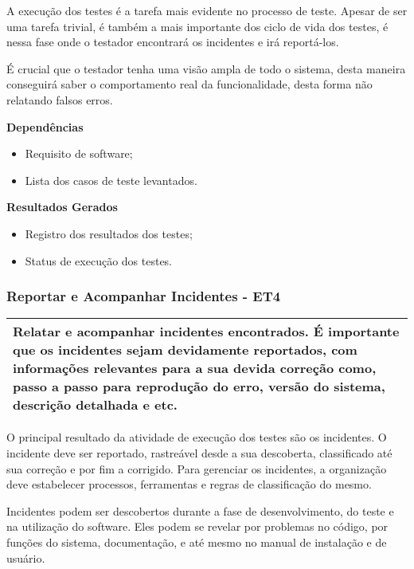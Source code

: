 A execução dos testes é a tarefa mais evidente no processo de teste. Apesar de ser uma tarefa trivial, é também a mais importante dos ciclo de vida dos testes, é nessa fase onde o testador encontrará os incidentes e irá reportá-los.

É crucial que o testador tenha uma visão ampla de todo o sistema, desta maneira conseguirá saber o comportamento real da funcionalidade, desta forma não relatando falsos erros.

\textbf{Dependências}
\begin{itemize}
    \item Requisito de software;
    \item Lista dos casos de teste levantados.
\end{itemize}

\textbf{Resultados Gerados}
\begin{itemize}
    \item Registro dos resultados dos testes;
    \item Status de execução dos testes.
\end{itemize}


\subsubsection{Reportar e Acompanhar Incidentes - ET4}
\label{sec:et4}

\begin{table}[!ht]
\centering
\begin{tabular}{|p{130mm}|}
\hline
Relatar e acompanhar incidentes encontrados. É importante que os incidentes sejam devidamente reportados, com informações relevantes para a sua devida correção como, passo a passo para reprodução do erro, versão do sistema, descrição detalhada e etc. \\ 
\hline
\end{tabular}
\end{table}

O principal resultado da atividade de execução dos testes são os incidentes. O incidente deve ser reportado, rastreável desde a sua descoberta, classificado até sua correção e por fim a corrigido. Para gerenciar os incidentes, a organização deve estabelecer processos, ferramentas e regras de classificação do mesmo.

Incidentes podem ser descobertos durante a fase de desenvolvimento, do teste e na utilização do software. Eles podem se revelar por problemas no código, por funções do sistema, documentação, e até mesmo no manual de instalação e de usuário.


